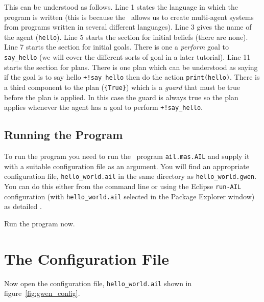 This can be understood as follows.  Line 1 states the language in which the program is written (this is because the \ail\ allows us to create multi-agent systems from programs written in several different languages).  Line 3 gives the name of the agent (\lstinline{hello}).  Line 5 starts the section for initial beliefs (there are none).  Line 7 starts the section for initial goals.  There is one a \emph{perform} goal to \lstinline{say_hello} (we will cover the different sorts of goal in a later tutorial).  Line 11 starts the section for plans.  There is one plan which can be understood as saying if the goal is to say hello \lstinline{+!say_hello} then do the action \lstinline{print(hello)}.  There is a third component to the plan (\lstinline+{True}+) which is a \emph{guard} that must be true before the plan is applied.  In this case the guard is always true so the plan applies whenever the agent has a goal to perform \lstinline{+!say_hello}.

\subsection{Running the Program}

To run the program you need to run the \java\ program \texttt{ail.mas.AIL} and supply it with a suitable configuration file as an argument.  You will find an appropriate configuration file, \texttt{hello\_world.ail} in the same directory as \texttt{hello\_world.gwen}.  You can do this either from the command line or using the Eclipse \texttt{run-AIL} configuration (with \texttt{hello\_world.ail} selected in the Package Explorer window) as detailed .

Run the program now.

\section{The Configuration File}
Now open the configuration file, \texttt{hello\_world.ail} shown in figure~\ref{fig:gwen_config}.

